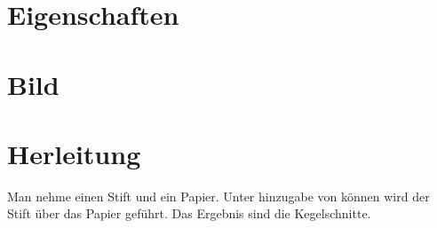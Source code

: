 \setcounter{section}{0}
\section{Eigenschaften}
\section{Bild}
\section{Herleitung}
Man nehme einen Stift und ein Papier. Unter hinzugabe von können wird der Stift über das Papier geführt. Das Ergebnis sind die Kegelschnitte.